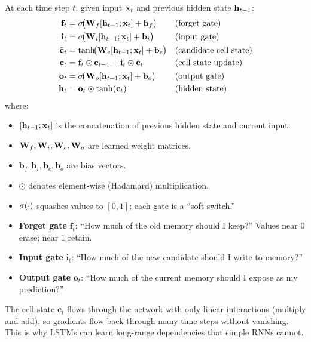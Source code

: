 \begin{definition}
At each time step $t$, given input $\mathbf{x}_t$ and previous hidden state $\mathbf{h}_{t-1}$:
\begin{align}
  \mathbf{f}_t &= \sigma\!\bigl(\mathbf{W}_f [\mathbf{h}_{t-1}; \mathbf{x}_t] + \mathbf{b}_f\bigr)
    && \text{(forget gate)} \label{eq:lstm:forget} \\
  \mathbf{i}_t &= \sigma\!\bigl(\mathbf{W}_i [\mathbf{h}_{t-1}; \mathbf{x}_t] + \mathbf{b}_i\bigr)
    && \text{(input gate)} \label{eq:lstm:input} \\
  \tilde{\mathbf{c}}_t &= \tanh\!\bigl(\mathbf{W}_c [\mathbf{h}_{t-1}; \mathbf{x}_t] + \mathbf{b}_c\bigr)
    && \text{(candidate cell state)} \label{eq:lstm:candidate} \\
  \mathbf{c}_t &= \mathbf{f}_t \odot \mathbf{c}_{t-1}
    + \mathbf{i}_t \odot \tilde{\mathbf{c}}_t
    && \text{(cell state update)} \label{eq:lstm:cell} \\
  \mathbf{o}_t &= \sigma\!\bigl(\mathbf{W}_o [\mathbf{h}_{t-1}; \mathbf{x}_t] + \mathbf{b}_o\bigr)
    && \text{(output gate)} \label{eq:lstm:output} \\
  \mathbf{h}_t &= \mathbf{o}_t \odot \tanh(\mathbf{c}_t)
    && \text{(hidden state)} \label{eq:lstm:hidden}
\end{align}
where:
\begin{itemize}[nosep]
  \item $[\mathbf{h}_{t-1}; \mathbf{x}_t]$ is the concatenation of previous hidden state and current input.
  \item $\mathbf{W}_f, \mathbf{W}_i, \mathbf{W}_c, \mathbf{W}_o$ are learned weight matrices.
  \item $\mathbf{b}_f, \mathbf{b}_i, \mathbf{b}_c, \mathbf{b}_o$ are bias vectors.
  \item $\odot$ denotes element-wise (Hadamard) multiplication.
  \item $\sigma(\cdot)$ squashes values to $[0,1]$; each gate is a ``soft switch.''
\end{itemize}
\end{definition}

\begin{intuition}
\begin{itemize}[nosep]
  \item \textbf{Forget gate} $\mathbf{f}_t$: ``How much of the old memory should I keep?'' Values near 0 erase; near 1 retain.
  \item \textbf{Input gate} $\mathbf{i}_t$: ``How much of the new candidate should I write to memory?''
  \item \textbf{Output gate} $\mathbf{o}_t$: ``How much of the current memory should I expose as my prediction?''
\end{itemize}
The cell state $\mathbf{c}_t$ flows through the network with only linear interactions (multiply and add), so gradients flow back through many time steps without vanishing.
This is why LSTMs can learn long-range dependencies that simple RNNs cannot.
\end{intuition}

